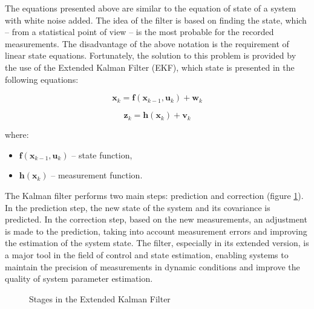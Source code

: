 The equations presented above are similar to the equation of state of a system with white noise added. The idea of the filter is based on finding the state, which -- from a statistical point of view -- is the most probable for the recorded measurements. The disadvantage of the above notation is the requirement of linear state equations. Fortunately, the solution to this problem is provided by the use of the Extended Kalman Filter (EKF), which state is presented in the following equations:

\begin{equation}
	\bm{x}_k =  \bm{f} \left( \bm{x}_{k-1},  \bm{u}_k \right) + \bm{w}_k
	\label{ekf1}
\end{equation}

\begin{equation}
	\bm{z}_k = \bm{h} \left(\bm{x}_k \right) + \bm{v}_k
	\label{ekf2}
\end{equation}


where:
\begin{itemize}
	\item $\bm{f} \left( \bm{x}_{k-1},  \bm{u}_k \right)$ -- state function, 
	\item $\bm{h} \left(\bm{x}_k \right)$ -- measurement function.
\end{itemize}

The Kalman filter performs two main steps: prediction and correction (figure \ref{kf_diagram}). In the prediction step, the new state of the system and its covariance is predicted. In the correction step, based on the new measurements, an adjustment is made to the prediction, taking into account measurement errors and improving the estimation of the system state. The filter, especially in its extended version, is a major tool in the field of control and state estimation, enabling systems to maintain the precision of measurements in dynamic conditions and improve the quality of system parameter estimation.\\


\begin{figure}[!h]
	\centering
	\caption{Stages in the Extended Kalman Filter}
	\label{kf_diagram}
\end{figure}

